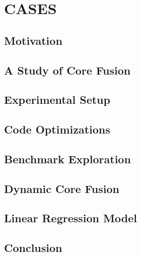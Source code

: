 \newcommand{\bm}[1]{\textit{#1}}
\setlength{\textfloatsep}{0.1cm}

\chapter{CASES}




%

\section{Motivation}\label{sec:motivation}


\section{A Study of Core Fusion}\label{sec:lim_study}


\section{Experimental Setup}\label{sec:setup}


\section{Code Optimizations}\label{sec:opt}


\section{Benchmark Exploration}\label{sec:expl}


\section{Dynamic Core Fusion}\label{sec:dynamic}



\section{Linear Regression Model}\label{sec:model}


%

\section{Conclusion}\label{sec:conc}

